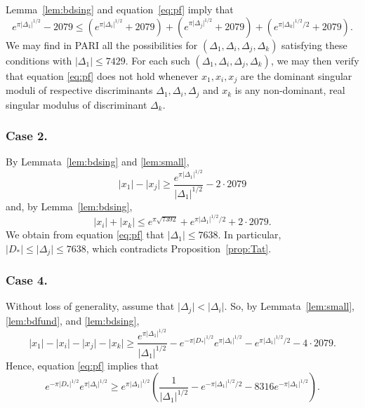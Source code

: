\documentclass[12pt,a4paper,oneside]{amsart}
\begin{document}
Lemma~\ref{lem:bdsing} and equation~\eqref{eq:pf} imply that 
\[ e^{\pi \lvert \Delta_1 \rvert^{1/2}} - 2079 \leq (e^{\pi \lvert \Delta_i \rvert^{1/2}} + 2079) + (e^{\pi \lvert \Delta_j \rvert^{1/2}} + 2079) + (e^{\pi \lvert \Delta_k \rvert^{1/2}/2} + 2079).\]
We may find in PARI all the possibilities for $(\Delta_1, \Delta_i, \Delta_j, \Delta_k)$ satisfying these conditions with $\lvert \Delta_1 \rvert \leq 7429$. For each such $(\Delta_1, \Delta_i, \Delta_j, \Delta_k)$, we may then verify that equation \eqref{eq:pf} does not hold whenever $x_1, x_i, x_j$ are the dominant singular moduli of respective discriminants $\Delta_1, \Delta_i, \Delta_j$ and $x_k$ is any non-dominant, real singular modulus of discriminant $\Delta_k$.

\subsubsection{Case 2.} By Lemmata~\ref{lem:bdsing} and \ref{lem:small},
\[ \lvert x_1 \rvert - \lvert x_j  \rvert \geq \frac{e^{\pi \lvert \Delta_1 \rvert^{1/2}}}{\lvert \Delta_1 \rvert^{1/2}} - 2 \cdot 2079\]
and, by Lemma~\ref{lem:bdsing},
\[ \lvert x_i \rvert + \lvert x_k \rvert  \leq e^{\pi \sqrt{7392}} + e^{\pi \lvert \Delta_1 \rvert^{1/2}/2} +2 \cdot 2079.\]
We obtain from equation \eqref{eq:pf} that $\lvert \Delta_1 \rvert \leq 7638$. In particular, $\lvert D_* \rvert \leq \lvert \Delta_j \rvert \leq 7638$, which contradicts Proposition~\ref{prop:Tat}.

\subsubsection{Case 4.} Without loss of generality, assume that $\lvert \Delta_j \rvert < \lvert \Delta_i \rvert$. So, by Lemmata~\ref{lem:small}, \ref{lem:bdfund}, and \ref{lem:bdsing},
\[ \lvert x_1 \rvert - \lvert x_i \rvert - \lvert x_j \rvert - \lvert x_k \rvert \geq \frac{e^{\pi \lvert \Delta_1 \rvert^{1/2}}}{\lvert \Delta_1 \rvert^{1/2}} - e^{-\pi \lvert D_* \rvert^{1/2}} e^{\pi \lvert \Delta_i \rvert^{1/2}} - e^{\pi \lvert \Delta_1 \rvert^{1/2}/2} -4 \cdot 2079.\]
Hence, equation \eqref{eq:pf} implies that
\[ e^{-\pi \lvert D_* \rvert^{1/2}} e^{\pi \lvert \Delta_i \rvert^{1/2}} \geq e^{\pi \lvert \Delta_1 \rvert^{1/2}} \left(\frac{1}{\lvert \Delta_1 \rvert^{1/2}} - e^{-\pi \lvert \Delta_1 \rvert^{1/2}/2} - 8316 e^{-\pi \lvert \Delta_1 \rvert^{1/2}}\right).\]
\end{document}
